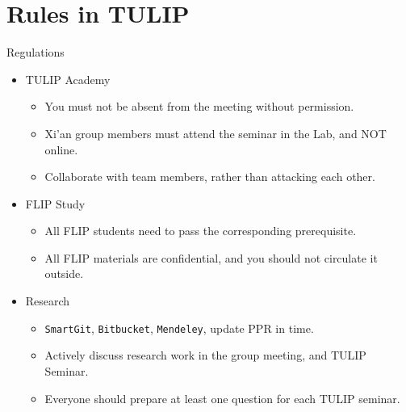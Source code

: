 \documentclass[
 size=14pt,
 paper=smartboard,  %
 mode=present, 		%
 display=slides, 	%
 style=tuliplab,  	%
 pauseslide,
 fleqn,leqno]{powerdot}
\begin{document}
\section{Rules in TULIP}


\begin{slide}{Regulations}

\begin{center}
\begin{itemize}

\item<1->
{TULIP Academy}

\begin{itemize}
\item
You must not be absent from the meeting without permission.

\item
Xi'an group members must attend the seminar in the Lab,
and NOT online.

\item
Collaborate with team members, rather than attacking each other.
\end{itemize}

\item<2->
{FLIP Study}

\begin{itemize}
\item
All FLIP students need to pass the corresponding prerequisite.

\item
All FLIP materials are confidential, and you should not circulate it outside.
\end{itemize}

\item<3->
{Research}

\begin{itemize}
\item
\texttt{SmartGit}, \texttt{Bitbucket}, \texttt{Mendeley},
update PPR in time.

\item
Actively discuss research work in the group meeting, and TULIP Seminar.

\item
Everyone should prepare at least one question for each TULIP seminar.
\end{itemize}
\end{itemize}
\end{center}

\end{slide}
\end{document}
